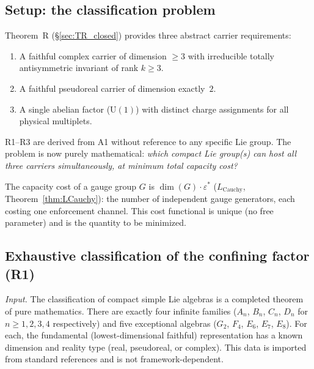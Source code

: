 \documentclass[11pt,a4paper]{article}
\theoremstyle{definition}
\newcommand{\U}{\mathrm{U}}
\begin{document}
\subsection{Setup: the classification problem}
\label{sec:gauge_setup}

Theorem~R (\S\ref{sec:TR_closed}) provides three abstract carrier
requirements:
\begin{enumerate}[label=\textbf{R\arabic*},nosep,leftmargin=3em]
  \item A faithful complex carrier of dimension $\ge 3$ with irreducible
        totally antisymmetric invariant of rank $k \ge 3$.
  \item A faithful pseudoreal carrier of dimension exactly~$2$.
  \item A single abelian factor ($\U(1)$) with distinct charge
        assignments for all physical multiplets.
\end{enumerate}
R1--R3 are derived from A1 without reference to any specific Lie group.
The problem is now purely mathematical: \emph{which compact Lie group(s)
can host all three carriers simultaneously, at minimum total capacity cost?}

The capacity cost of a gauge group $G$ is $\dim(G) \cdot \varepsilon^*$
($L_{\mathrm{Cauchy}}$, Theorem~\ref{thm:LCauchy}): the number of
independent gauge generators, each costing one enforcement channel.
This cost functional is unique (no free parameter) and is the quantity
to be minimized.


\subsection{Exhaustive classification of the confining factor (R1)}
\label{sec:R1_classification}

\noindent\textit{Input.}  The classification of compact simple Lie algebras
is a completed theorem of pure mathematics.  There are exactly four infinite
families ($A_n$, $B_n$, $C_n$, $D_n$ for $n \ge 1, 2, 3, 4$ respectively)
and five exceptional algebras ($G_2$, $F_4$, $E_6$, $E_7$, $E_8$).
For each, the fundamental (lowest-dimensional faithful) representation
has a known dimension and reality type (real, pseudoreal, or complex).
This data is imported from standard references
\cite{Humphreys1972,FultonHarris1991} and is not framework-dependent.
\end{document}
